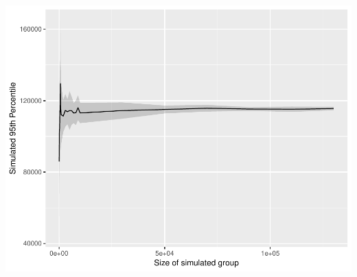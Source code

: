\documentclass[12pt,twoside]{dukestatscithesis}
\theoremstyle{definition}
\theoremstyle{definition}
\theoremstyle{definition}
\theoremstyle{remark}
\begin{document}
\includegraphics{thesis_files/figure-latex/unnamed-chunk-5-3.pdf}
\end{document}
